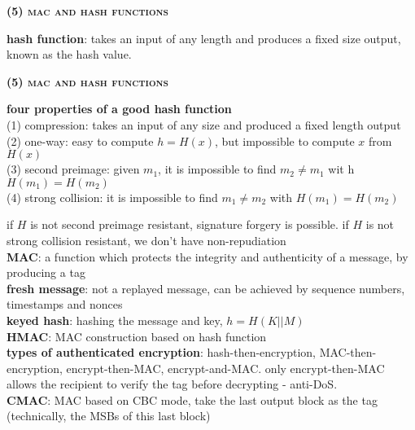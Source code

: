 \documentclass[a4paper]{article}
\begin{document}
\begin{multicols}{2}
\begin{framed}
	\begin{center}
		\textbf{\textsc{(5) mac and hash functions}}
	\end{center}
	
	\noindent
	\textbf{hash function}: takes an input of any length and produces a fixed size output, known as the hash value.\\
\end{framed}

\begin{framed}
	\begin{center}
		\textbf{\textsc{(5) mac and hash functions}}
	\end{center}

	\noindent
	\textbf{four properties of a good hash function}\\
	(1) compression: takes an input of any size and produced a fixed length output\\
	(2) one-way: easy to compute $h = H(x)$, but impossible to compute $x$ from $H(x)$\\
	(3) second preimage: given $m_1$, it is impossible to find $m_2 \neq m_1$ wit h $H(m_1) = H(m_2)$\\
	(4) strong collision: it is impossible to find $m_1 \neq m_2$ with $H(m_1) = H(m_2)$
	
	\noindent
	if $H$ is not second preimage resistant, signature forgery is possible. if $H$ is not strong collision resistant, we don't have non-repudiation\\
	
	\noindent
	\textbf{MAC}: a function which protects the integrity and authenticity of a message, by producing a tag\\
	\textbf{fresh message}: not a replayed message, can be achieved by sequence numbers, timestamps and nonces\\
	\textbf{keyed hash}: hashing the message and key, $h = H(K \vert \vert M)$\\
	\textbf{HMAC}: MAC construction based on hash function\\
	
	\noindent
	\textbf{types of authenticated encryption}: hash-then-encryption, MAC-then-encryption, encrypt-then-MAC, encrypt-and-MAC. only encrypt-then-MAC allows the recipient to verify the tag before decrypting - anti-DoS.\\
	
	\noindent
	\textbf{CMAC}: MAC based on CBC mode, take the last output block as the tag (technically, the MSBs of this last block)
\end{framed}


\end{multicols}
\end{document}
